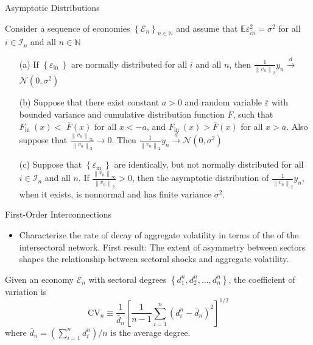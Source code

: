 \documentclass[dvipsnames]{beamer}
\begin{document}
\begin{frame}{Asymptotic Distributions}
  \begin{theorem}[Theorem 1]
    Consider a sequence of economies $\left\{\mathcal{E}_{n}\right\}_{n \in \mathbb{N}}$ and assume that $\mathbb{E} \varepsilon_{i n}^{2}=\sigma^{2}$ for all $i \in \mathcal{I}_{n}$ and all $n \in \mathbb{N}$
    \begin{enumerate}
    \item[(a)]
 If $\left\{\varepsilon_{\text {in }}\right\}$ are normally distributed for all $i$ and all $n$, then $\frac{1}{\left\|v_{n}\right\|_{2}} y_{n} \stackrel{d}{\longrightarrow}$ $\mathcal{N}\left(0, \sigma^{2}\right)$
\item[(b)] Suppose that there exist constant $a>0$ and random variable $\bar{\varepsilon}$ with bounded variance and cumulative distribution function $\bar{F}$, such that $F_{\text {in }}(x)<$ $\bar{F}(x)$ for all $x<-a$, and $F_{\text {in }}(x)>\bar{F}(x)$ for all $x>a .$ Also suppose that $\frac{\left\|v_{n}\right\|_{\infty}}{\left\|v_{n}\right\|_{2}} \longrightarrow 0 .$ Then $\frac{1}{\left\|v_{n}\right\|_{2}} y_{n} \stackrel{d}{\longrightarrow} \mathcal{N}\left(0, \sigma^{2}\right)$
\item[(c)] Suppose that $\left\{\varepsilon_{\text {in }}\right\}$ are identically, but not normally distributed for all $i \in \mathcal{I}_{n}$ and all $n .$ If $\frac{\left\|v_{n}\right\|_{\infty}}{\left\|v_{n}\right\|_{2}}>0$, then the asymptotic distribution of $\frac{1}{\left\|v_{n}\right\|_{2}} y_{n}$, when it exists, is nonnormal and has finite variance $\sigma^{2}$.
    \end{enumerate}
  \end{theorem}
\end{frame}
%
\begin{frame}{First-Order Interconnections}
  \begin{itemize}
  \item Characterize the rate of decay of aggregate volatility in terms of the  of the intersectoral network.
    \vitem First result: The extent of asymmetry between sectors shapes the relationship between sectoral shocks and aggregate volatility.
  \end{itemize}
  \begin{definition}
     Given an economy $\mathcal{E}_{n}$ with sectoral degrees $\left\{d_{1}^{n}, d_{2}^{n}, \ldots, d_{n}^{n}\right\}$, the coefficient of variation is
$$
\mathrm{CV}_{n} \equiv \frac{1}{\bar{d}_{n}}\left[\frac{1}{n-1} \sum_{i=1}^{n}\left(d_{i}^{n}-\bar{d}_{n}\right)^{2}\right]^{1 / 2}
$$
where $\bar{d}_{n}=\left(\sum_{i=1}^{n} d_{i}^{n}\right) / n$ is the average degree.
  \end{definition}
\end{frame}
\end{document}
